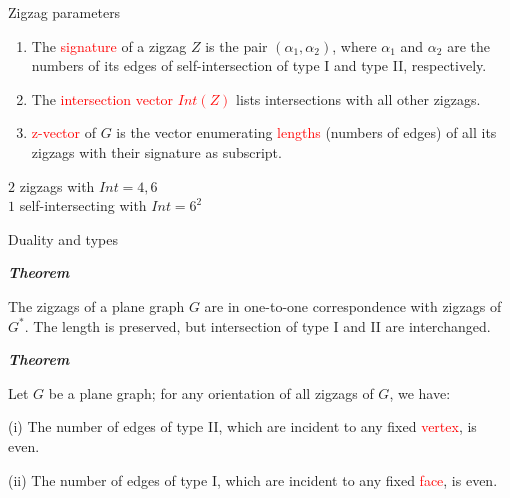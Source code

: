 \documentclass[%
pdf,
colorBG,
slideColor,
]{prosper}
\begin{document}
\begin{slide}{Zigzag parameters}

\begin{enumerate}
\item[\ding{108}] The \textcolor{red}{signature} of a zigzag $Z$ is
the pair $(\alpha_1,\alpha_2)$, where $\alpha_1$ and $\alpha_2$ are the
numbers of its edges of self-intersection of type I and type II, respectively.

\vspace{1mm}

\item[\ding{108}] The \textcolor{red}{intersection vector $Int(Z)$} lists
intersections with all other zigzags.

\vspace{1mm}

\item[\ding{108}] \textcolor{red}{z-vector} of $G$ is the
vector enumerating \textcolor{red}{lengths} (numbers of edges) of all its
zigzags with their signature as subscript.



\end{enumerate}

\begin{center}
\begin{minipage}{3cm}
\epsfxsize=25mm
\end{minipage}
\begin{minipage}{7cm}
$2$ zigzags with $Int=4, 6$\\
$1$ self-intersecting with $Int=6^{2}$
\end{minipage}
\end{center}

\end{slide}







\begin{slide}{Duality and types}

{\em {\bf Theorem}

The zigzags of a plane graph $G$ are in one-to-one correspondence with zigzags of $G^*$.
The length is preserved, but intersection of type I and II are interchanged.

}

\vspace{2mm}

{\em {\bf Theorem}

Let $G$ be a plane graph; for any orientation of all zigzags of $G$, we have:

(i) The number of edges of type II, which are incident to any fixed \textcolor{red}{vertex}, is even.

(ii) The number of edges of type I, which are incident to any fixed \textcolor{red}{face}, is even.
}


\end{slide}
\end{document}
